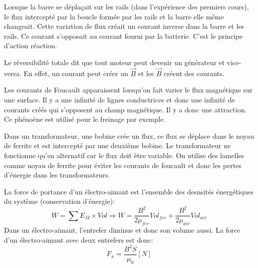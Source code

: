 \documentclass[11pt,a4paper]{article} %
\newcommand{\B}{\vec B}
\begin{document}
Lorsque la barre se déplaçait sur les rails (dans l'expérience des premiers cours), le flux intercepté par la boucle formée par les rails et la barre elle même changeait. Cette variation de flux créait un courant inverse dans la barre et les rails. Ce courant s'opposait au courant fourni par la batterie. C'est le principe d'action réaction.

Le réversibilité totale dit que tout moteur peut devenir un générateur et vice-versa. En effet, un courant peut créer un $\B$ et les $\B$ créent des courants.

Les courants de Foucault apparaissent lorsqu'on fait varier le flux magnétique sur une surface. Il y a une infinité de lignes conductrices et donc une infinité de courants créés qui s'opposent au champ magnétique. Il y a donc une attraction. Ce phénoène est utilisé pour le freinage par exemple.

Dans un transformateur, une bobine crée un flux, ce flux se déplace dans le noyau de ferrite et est intercepté par une deuxième bobine. Le transformateur ne fonctionne qu'en alternatif car le flux doit être variable. 
On utilise des lamelles comme noyau de ferrite pour éviter les courants de foucault et donc les pertes d'énergie dans les transformateurs.

La force de portance d'un électro-aimant est l'ensemble des desnsités énergétiques du système (conservation d'énergie):
$$W = \sum E_M \times Vol \Rightarrow W = \frac{B^2}{2\mu_{fer}}Vol_{fer} + \frac{B^2}{2\mu_{air}}Vol_{air} $$
Dans un électro-aimant, l'entrefer diminue et donc son volume aussi. La force d'un électro-aimant avec deux entrefers est donc:
$$F_x = \frac{B^2S}{\mu_0} [N]$$
\end{document}
